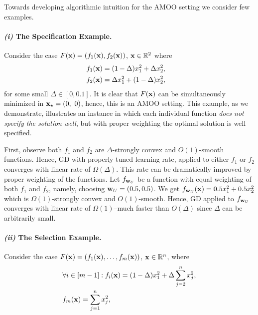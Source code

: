 Towards developing algorithmic intuition for the AMOO setting we consider few examples. 

\paragraph{\emph{(i)} The Specification Example.}

Consider the case $F({\mathbf{x}})=(f_1({\mathbf{x}}),f_2({\mathbf{x}}))$, ${\mathbf{x}}\in \mathbb{R}^2$ where
\begin{align*}
    &f_1({\mathbf{x}}) = (1-\Delta) x_1^2 + \Delta x_2^2, \quad \\
    &f_2({\mathbf{x}}) = \Delta x_1^2 +  (1-\Delta) x_2^2,
\end{align*}
for some small $\Delta\in [0,0.1]$. It is clear that $F({\mathbf{x}})$ can be simultaneously minimized in ${\mathbf{x}}_\star=\left( 0,\ 0 \right)$, hence, this is an AMOO setting. This example, as we demonstrate, illustrates an instance in which each individual function \textit{does not specify the solution well}, but with proper weighting the optimal solution is well specified.

First, observe both $f_1$ and $f_2$ are $\Delta$-strongly convex and $O(1)$-smooth functions. Hence, GD with properly tuned learning rate, applied to either $f_1$ or $f_2$ converges with linear rate of $\Omega(\Delta)$. This rate can be  dramatically improved by proper weighting of the functions. Let $f_{{\mathbf{w}}_U}$ be a function with equal weighting of both $f_1$ and $f_2$, namely, choosing ${\mathbf{w}}_U=(0.5,0.5)$. We get $f_{{\mathbf{w}}_U}({\mathbf{x}})=0.5 x_1^2 + 0.5 x_2^2$
which is $\Omega(1)$-strongly convex and $O(1)$-smooth. Hence, GD applied to $f_{{\mathbf{w}}_U}$ converges with linear rate of $\Omega(1)$--much faster than $O(\Delta)$ since $\Delta$ can be arbitrarily small.



\paragraph{\emph{(ii)} The Selection Example.}
Consider the case $F({\mathbf{x}})=(f_1({\mathbf{x}}),\ldots,f_m({\mathbf{x}}))$, ${\mathbf{x}}\in \mathbb{R}^n$, where
\begin{align*}
    & \forall i \in [m-1] : f_i({\mathbf{x}}) = (1-\Delta)x_1^2 + \Delta \sum_{j=2}^{n} x_j^2,\\
    &f_m({\mathbf{x}}) = \sum_{j=1}^{n} x_j^2,
\end{align*}


